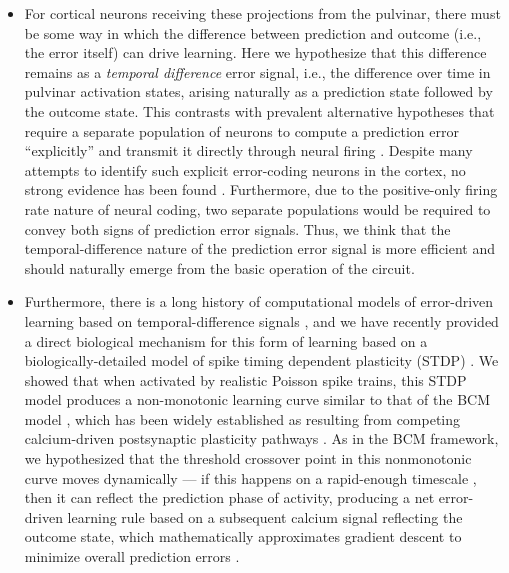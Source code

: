 \documentclass[11pt,twoside]{article}
\newif\myifpdf
\begin{document}
\begin{itemize}
	\item For cortical neurons receiving these projections from the pulvinar, there must be some way in which the difference between prediction and outcome (i.e., the error itself) can drive learning.  Here we hypothesize that this difference remains as a \emph{temporal difference} error signal, i.e., the difference over time in pulvinar activation states, arising naturally as a prediction state followed by the outcome state.  This contrasts with prevalent alternative hypotheses that require a separate population of neurons to compute a prediction error ``explicitly'' and transmit it directly through neural firing \cite{RaoBallard99,KawatoHayakawaInui93,Friston05,Friston10,OudenKokLange12,LotterKreimanCox16}.  Despite many attempts to identify such explicit error-coding neurons in the cortex, no strong evidence has been found \cite{KokLange15,KokJeheedeLange12,SummerfieldEgner09,LeeMumford03,WalshMcGovernClarkEtAl20}.  Furthermore, due to the positive-only firing rate nature of neural coding, two separate populations would be required to convey both signs of prediction error signals.  Thus, we think that the temporal-difference nature of the prediction error signal is more efficient and should naturally emerge from the basic operation of the circuit.
	\item Furthermore, there is a long history of computational models of error-driven learning based on temporal-difference signals \cite{AckleyHintonSejnowski85,OReilly96}, and we have recently provided a direct biological mechanism for this form of learning based on a biologically-detailed model of spike timing dependent plasticity (STDP) \cite{UrakuboHondaFroemkeEtAl08}.  We showed that when activated by realistic Poisson spike trains, this STDP model produces a non-monotonic learning curve similar to that of the BCM model \cite{BienenstockCooperMunro82}, which has been widely established as resulting from competing calcium-driven postsynaptic plasticity pathways \cite{LuscherMalenka12}.  As in the BCM framework, we hypothesized that the threshold crossover point in this nonmonotonic curve moves dynamically --- if this happens on a rapid-enough timescale \cite{LimMcKeeWoloszynEtAl15}, then it can reflect the prediction phase of activity, producing a net error-driven learning rule based on a subsequent calcium signal reflecting the outcome state, which mathematically approximates gradient descent to minimize overall prediction errors \cite{OReilly96}.
\end{itemize}
\end{document}
